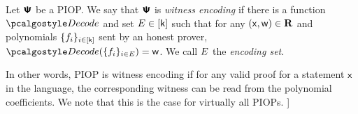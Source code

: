 \documentclass[runningheads,11pt]{llncs}
\begin{document}

\begin{definition}
  Let $\bm{\mathsf{\Psi}}$ be a PIOP.  We say that $\bm{\mathsf{\Psi}}$ is \emph{witness encoding} if there is
  a function $\decode$ and set $E \in [\mathsf{k}]$ such that for any
  $(\mathsf{x}, \mathsf{w}) \in \mathbf{R}$ and polynomials $\{f_i\}_{i \in [\mathsf{k}]}$ sent by an
  honest prover, $\decode(\smallset{f_i}_{i \in \encset}) = \wit$. We call $E$ the
  \emph{encoding set}.
\end{definition}
In other words, PIOP is witness encoding if for any valid proof for a statement
$\mathsf{x}$ in the language, the corresponding witness can be read from the
polynomial coefficients. We note that this is the case for virtually all
PIOPs. ]


  
\end{document}
